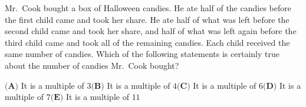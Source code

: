 Mr.\ Cook bought a box of Halloween candies. He ate half of the candies before the first child came and took her share. He ate half of what was left before the second child came and took her share, and half of what was left again before the third child came and took all of the remaining candies. Each child received the same number of candies. Which of the following statements is certainly true about the number of candies Mr.\ Cook bought?

$\textbf{(A)}$ It is a multiple of $3$\qquad $\textbf{(B)}$ It is a multiple of $4$\qquad $\textbf{(C)}$ It is a multiple of $6$\qquad $\textbf{(D)}$ It is a multiple of $7$\qquad $\textbf{(E)}$ It is a multiple of $11$
